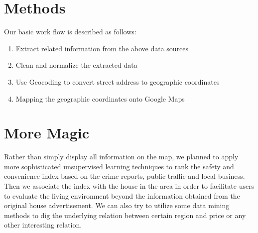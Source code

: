 \documentclass{llncs}
\begin{document}
\section{Methods}

Our basic work flow is described as follows:
\begin{enumerate}
  \item Extract related information from the above data sources
  \item Clean and normalize the extracted data
  \item Use Geocoding to convert street address to geographic coordinates
  \item Mapping the geographic coordinates onto Google Maps
\end{enumerate}


\section{More Magic}

Rather than simply display all information on the map, we planned to apply more sophisticated unsupervised learning techniques to rank the safety and convenience index based on the crime reports, public traffic and local business. Then we associate the index with the house in the area in order to facilitate users to evaluate the living environment beyond the information obtained from the original house advertisement. We can also try to utilize some data mining methods to dig the underlying relation between certain region and price or any other interesting relation.





\end{document}
